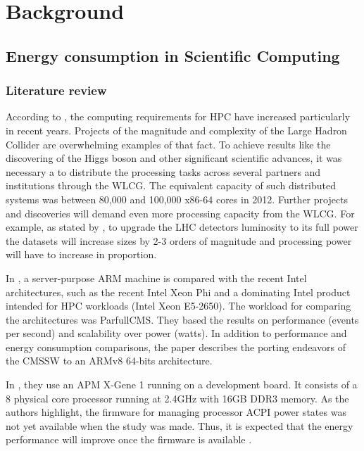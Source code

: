 \chapter{Background}

\section{Energy consumption in Scientific Computing}
\subsection{Literature review}

According to  \cite{ACAT13ARM}, the computing requirements for HPC have 
increased particularly in recent
years. Projects of the magnitude and complexity of the Large Hadron Collider are
overwhelming examples of that fact. To achieve results like the discovering of
the Higgs boson and other significant scientific advances, it was necessary a 
 to distribute the processing tasks across several partners and institutions
through the WLCG. The equivalent capacity of such distributed systems was between 
80,000 and 100,000 x86-64 cores in 2012.
Further projects and discoveries will demand even more processing capacity from
the WLCG. For example, as stated by \cite{ACAT13ARM}, to upgrade the LHC 
detectors luminosity to its full power the datasets will increase sizes by 2-3
orders of magnitude and processing power will have to increase in proportion.


% 
In \cite{ACAT14ARMDAVID}, a server-purpose ARM machine is compared with the recent
Intel architectures, such as the recent Intel Xeon Phi and a dominating Intel product
intended for HPC workloads (Intel Xeon E5-2650). The workload for comparing
the architectures was ParfullCMS. They based the results on performance (events per
second) and scalability over power (watts). In addition to performance and energy
consumption comparisons, the paper describes the porting endeavors of the CMSSW to
an ARMv8 64-bits architecture.

In \cite{ACAT14ARMDAVID}, they use an APM X-Gene 1 running on a development board. 
It consists of a 8 physical core processor running at 2.4GHz with 16GB DDR3 memory.
As the authors highlight, the firmware for managing processor ACPI power states was
not yet available when the study was made. Thus, it is expected that the energy 
performance will improve once the firmware is available \cite{ACAT14ARMDAVID}.


